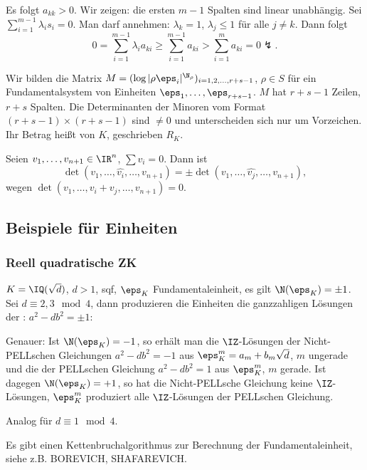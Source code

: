   \begin{Beweis}
    Es folgt $a_{kk}>0$. Wir zeigen: die ersten $m-1$ Spalten sind linear unabhängig. Sei $\sum_{i=1}^{m-1}\lambda_is_i=0$. Man darf annehmen: $\lambda_k=1$, $\lambda_j\leq 1$ für alle $j\neq k$.
    Dann folgt 
    \[0=\sum_{i=1}^{m-1} \lambda_i a_{ki} \geq \sum_{i=1}^{m-1} a_{ki} > \sum_{i=1}^m a_{ki}=0 \lightning.\]
  \end{Beweis}
  
  \begin{Fakt}
   Wir bilden die Matrix $M=(\log|\rho\eps_i|^{\N_\rho})_{i=1,2,\ldots,r+s-1}$, $\rho\in S$ für ein Fundamentalsystem von Einheiten $\eps_1,\ldots,\eps_{r+s-1}$. $M$ hat $r+s-1$ Zeilen, $r+s$ Spalten. Die Determinanten der Minoren vom Format $(r+s-1)\times (r+s-1)$ sind $\neq 0$ und unterscheiden sich nur um Vorzeichen. Ihr Betrag heißt  von $K$, geschrieben $R_K$.
  \end{Fakt}

  \begin{Beweis}
  Seien $v_1,\ldots,v_{n+1}\in\IR^n$, $\sum v_i=0$. 
  Dann ist \[\det(v_1,\ldots,\hat{v_i},\ldots,v_{n+1})=\pm\det(v_1,\ldots,\hat{v_j},\ldots,v_{n+1}),\] wegen $\det(v_1,\ldots,v_i+v_j,\ldots,v_{n+1})=0$.
  \end{Beweis}

 \subsection{Beispiele für Einheiten}
\subsubsection{Reell quadratische ZK}
$K=\IQ(\sqrt d)$, $d>1$, sqf, $\eps_K$ Fundamentaleinheit, es gilt $\N(\eps_K)=\pm 1$. Sei $d\equiv 2,3 \mod{4}$, dann produzieren die Einheiten die ganzzahligen Lösungen der : $a^2-db^2=\pm 1$:

Genauer: Ist $\N(\eps_K)=-1$, so erhält man die $\IZ$-Lösungen der Nicht-PELLschen Gleichungen $a^2-db^2=-1$ aus $\eps_K^m=a_m+b_m\sqrt{d}$, $m$ ungerade und die der PELLschen Gleichung $a^2-db^2=1$ aus $\eps_K^m$, $m$ gerade. Ist dagegen $\N(\eps_K)=+1$, so hat die Nicht-PELLsche Gleichung keine $\IZ$-Lösungen, $\eps_K^m$ produziert alle $\IZ$-Lösungen der PELLschen Gleichung.

Analog für $d\equiv 1\mod{4}$.

\begin{Bemerkung}
 Es gibt einen Kettenbruchalgorithmus zur Berechnung der Fundamentaleinheit, siehe z.B. BOREVICH, SHAFAREVICH.
\end{Bemerkung}

